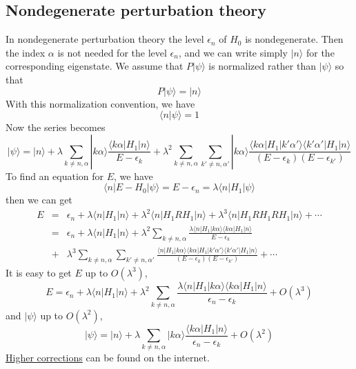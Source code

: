 \subsection{Nondegenerate perturbation theory}
In nondegenerate perturbation theory the level $\epsilon_n$ of $H_0$ is nondegenerate. Then the index $\alpha$ is not needed for the level $\epsilon_n$, and we can write simply $|n\rangle$ for the corresponding eigenstate. We assume that $P|\psi\rangle$ is normalized rather than $|\psi\rangle$ so that
\[P|\psi\rangle  = |n\rangle\]
With this normalization convention, we have
\[\langle n | \psi \rangle = 1\]
Now the series becomes
\[|\psi\rangle = |n\rangle + \lambda \sum_{k\neq n,\alpha} |k\alpha\rangle \frac{\langle k\alpha | H_1 | n \rangle}{E-\epsilon_k} + \lambda^2 \sum_{k\neq n,\alpha} \sum_{k'\neq n,\alpha'} |k\alpha\rangle \frac{\langle k\alpha | H_1 | k'\alpha' \rangle \langle k'\alpha' | H_1 | n \rangle}{(E-\epsilon_k)(E-\epsilon_{k'})}\]
To find an equation for $E$, we have
\[\langle n | E-H_0 | \psi\rangle = E-\epsilon_n = \lambda \langle n | H_1 | \psi\rangle\]
then we can get
\begin{eqnarray}
E &=& \epsilon_n + \lambda \langle n | H_1 | n\rangle + \lambda^2 \langle n | H_1RH_1 | n\rangle + \lambda^3 \langle n | H_1RH_1RH_1 | n\rangle + \cdots \nonumber \\
&=& \epsilon_n 
+ \lambda \langle n | H_1|n\rangle 
+ \lambda^2 \sum_{k\neq n,\alpha}  \frac{\lambda \langle n | H_1|k\alpha\rangle \langle k\alpha | H_1 | n \rangle}{E-\epsilon_k} \nonumber \\
&+& \lambda^3 \sum_{k\neq n,\alpha} \sum_{k'\neq n,\alpha'} \frac{\langle n | H_1 |k\alpha\rangle \langle k\alpha | H_1 | k'\alpha' \rangle \langle k'\alpha' | H_1 | n \rangle}{(E-\epsilon_k)(E-\epsilon_{k'})} + \cdots \nonumber
\end{eqnarray}
It is easy to get $E$ up to $O(\lambda^3)$,
\[E = \epsilon_n  + \lambda \langle n | H_1|n\rangle  + \lambda^2 \sum_{k\neq n,\alpha}  \frac{\lambda \langle n | H_1|k\alpha\rangle \langle k\alpha | H_1 | n \rangle}{\epsilon_n-\epsilon_k} + O(\lambda^3)\]
and $|\psi\rangle$ up to $O(\lambda^2)$,
\[|\psi\rangle = |n\rangle + \lambda \sum_{k\neq n,\alpha} |k\alpha\rangle \frac{\langle k\alpha | H_1 | n \rangle}{\epsilon_n-\epsilon_k} + O(\lambda^2)\]
\href{https://en.wikipedia.org/wiki/Perturbation_theory_(quantum_mechanics)#Second-order_and_higher_corrections}{Higher corrections} can be found on the internet.

